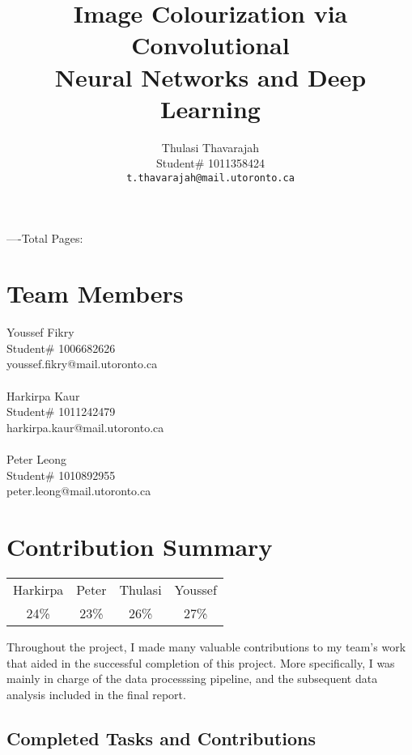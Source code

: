 \documentclass{article} %
\title{Image Colourization via Convolutional \\
Neural Networks and Deep Learning}
\author{Thulasi Thavarajah \\
Student\# 1011358424 \\
\texttt{t.thavarajah@mail.utoronto.ca} \\
\AND
}
\begin{document}
\maketitle


\begin{center}
----Total Pages: \pageref{last_page}  
\end{center}

\section{Team Members}

Youssef Fikry \\
Student\# 1006682626\\
youssef.fikry@mail.utoronto.ca \\ \\
Harkirpa Kaur  \\
Student\# 1011242479 \\
harkirpa.kaur@mail.utoronto.ca \\ \\
Peter Leong \\
Student\# 1010892955 \\
peter.leong@mail.utoronto.ca \\

\section{Contribution Summary}

\begin{table}[h]
\centering
\begin{tabular}{cccc}
\hline
Harkirpa & Peter & Thulasi & Youssef \\
24\% & 23\% & 26\% & 27\% \\
\hline
\end{tabular}
\end{table}

Throughout the project, I made many valuable contributions to my team's work that aided in the successful completion of this project. More specifically, I was mainly in charge of the data processsing pipeline, and the subsequent data analysis included in the final report. 

\subsection{Completed Tasks and Contributions}
\end{document}
